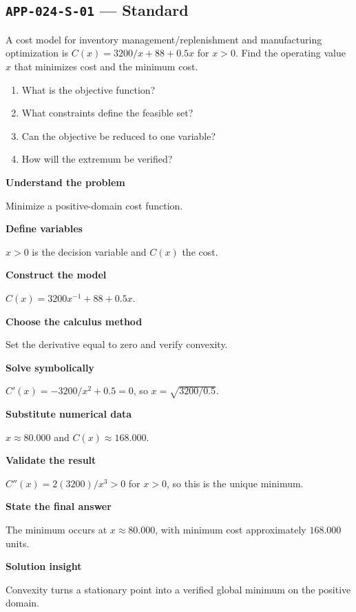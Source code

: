 \documentclass[11pt]{book}
\newcommand{\pid}[1]{\texttt{#1}}
\begin{document}
\subsection*{\pid{APP-024-S-01} — Standard}
\begin{problembox}
A cost model for inventory management/replenishment and manufacturing optimization is $C(x)=3200/x+88+0.5x$ for $x>0$. Find the operating value $x$ that minimizes cost and the minimum cost.
\end{problembox}
\begin{promptbox}\begin{enumerate}
\item What is the objective function?
\item What constraints define the feasible set?
\item Can the objective be reduced to one variable?
\item How will the extremum be verified?
\end{enumerate}\end{promptbox}
\begin{solutionbox}
\textbf{Understand the problem}\par Minimize a positive-domain cost function.\par\medskip
\textbf{Define variables}\par $x>0$ is the decision variable and $C(x)$ the cost.\par\medskip
\textbf{Construct the model}\par $C(x)=3200x^{-1}+88+0.5x$.\par\medskip
\textbf{Choose the calculus method}\par Set the derivative equal to zero and verify convexity.\par\medskip
\textbf{Solve symbolically}\par $C'(x)=-3200/x^2+0.5=0$, so $x=\sqrt{3200/0.5}$.\par\medskip
\textbf{Substitute numerical data}\par $x\approx 80.000$ and $C(x)\approx 168.000$.\par\medskip
\textbf{Validate the result}\par $C''(x)=2(3200)/x^3>0$ for $x>0$, so this is the unique minimum.\par\medskip
\textbf{State the final answer}\par The minimum occurs at $x\approx 80.000$, with minimum cost approximately $168.000$ units.\par\medskip
\textbf{Solution insight}\par Convexity turns a stationary point into a verified global minimum on the positive domain.\par\medskip
\end{solutionbox}
\end{document}
